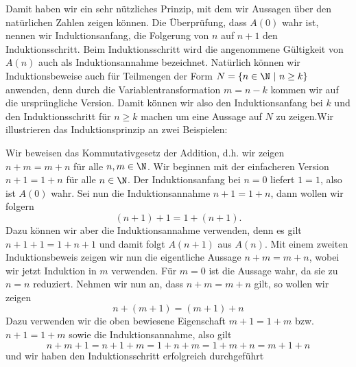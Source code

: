 \documentclass[letterpaper,10pt,english]{jupyterBook}
\begin{document}
Damit haben wir ein sehr nützliches Prinzip, mit dem wir Aussagen über den natürlichen Zahlen zeigen können. Die Überprüfung, dass \(A(0)\) wahr ist, nennen wir Induktionsanfang, die Folgerung von \(n\) auf \(n+1\) den Induktionsschritt. Beim Induktionsschritt wird die angenommene Gültigkeit von \(A(n)\) auch als Induktionsannahme bezeichnet. Natürlich können wir Induktionsbeweise auch für Teilmengen der Form \(N= \{n \in \N~|~n \geq k \}\)
anwenden, denn durch die Variablentransformation \(m=n-k\) kommen wir auf die ursprüngliche Version. Damit können wir also den Induktionsanfang bei \(k\) und den Induktionsschritt für \(n \geq k\) machen um eine Aussage auf \(N\) zu zeigen.Wir illustrieren das Induktionsprinzip an zwei Beispielen:
\label{grundlagen/zahlensysteme:example-2}
\begin{example}{}{}



Wir beweisen das Kommutativgesetz der Addition, d.h. wir zeigen \(n+m=m+n\) für alle \(n,m \in \N\). Wir beginnen mit der einfacheren Version \(n+1=1+n\) für alle \(n\in\N\). Der Induktionsanfang bei \(n=0\) liefert \(1=1\), also ist \(A(0)\) wahr. Sei nun die Induktionsannahme \(n+1=1+n\), dann wollen wir folgern
\begin{equation*}
 (n+1)+1=1+(n+1).
\end{equation*}
Dazu können wir aber die Induktionsannahme verwenden, denn es gilt \(n+1+1 = 1+n+1\) und damit folgt \(A(n+1)\) aus \(A(n)\).
Mit einem zweiten Induktionsbeweis zeigen wir nun die eigentliche Aussage \(n+m=m+n\), wobei wir jetzt Induktion in \(m\) verwenden. Für \(m=0\) ist die Aussage wahr, da sie zu \(n=n\) reduziert. Nehmen wir nun an, dass \(n+m=m+n\) gilt, so wollen wir zeigen
\begin{equation*}
 n+(m+1) = (m+1) + n
\end{equation*}
Dazu verwenden wir die oben bewiesene Eigenschaft \(m+1 =1+m\) bzw. \(n+1=1+m\) sowie die Induktionsannahme, also gilt
\begin{equation*}
 n+m+1=n+1+m=1+n+m=1+m+n=m+1+n
\end{equation*}
und wir haben den Induktionsschritt erfolgreich durchgeführt
\end{example}
\label{grundlagen/zahlensysteme:example-3}
\end{document}
